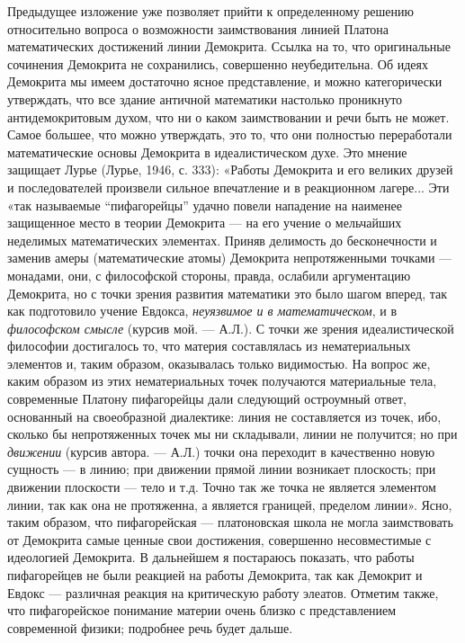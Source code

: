 Предыдущее изложение уже позволяет прийти к определенному решению
относительно вопроса о возможности заимствования линией Платона
математических достижений линии Демокрита. Ссылка на то, что
оригинальные сочинения Демокрита не сохранились, совершенно
неубедительна. Об идеях Демокрита мы имеем достаточно ясное
представление, и можно категорически утверждать, что все здание
античной математики настолько проникнуто антидемокритовым духом, что
ни о каком заимствовании и речи быть не может. Самое большее, что
можно утверждать, это то, что они полностью переработали
математические основы Демокрита в идеалистическом духе. Это мнение
защищает Лурье (Лурье, 1946, с. 333): «Работы Демокрита и его великих
друзей и последователей произвели сильное впечатление и в реакционном
лагере... Эти «так называемые ``пифагорейцы'' удачно повели нападение
на наименее защищенное место в теории Демокрита --- на его учение о
мельчайших неделимых математических элементах. Приняв делимость до
бесконечности и заменив амеры (математические атомы) Демокрита
непротяженными точками --- монадами, они, с философской стороны,
правда, ослабили аргументацию Демокрита, но с точки зрения развития
математики это было шагом вперед, так как подготовило учение Евдокса,
\emph{неуязвимое и в математическом}, и в \emph{философском смысле}
(курсив мой. --- А.Л.). С точки же зрения идеалистической философии
достигалось то, что материя составлялась из нематериальных элементов
и, таким образом, оказывалась только видимостью. На вопрос же, каким
образом из этих нематериальных точек получаются материальные тела,
современные Платону пифагорейцы дали следующий остроумный ответ,
основанный на своеобразной диалектике: линия не составляется из точек,
ибо, сколько бы непротяженных точек мы ни складывали, линии не
получится; но при \emph{движении} (курсив автора. --- А.Л.) точки она
переходит в качественно новую сущность --- в линию; при движении
прямой линии возникает плоскость; при движении плоскости --- тело и
т.д. Точно так же точка не является элементом линии, так как она не
протяженна, а является границей, пределом линии». Ясно, таким образом,
что пифагорейская --- платоновская школа не могла заимствовать от
Демокрита самые ценные свои достижения, совершенно несовместимые с
идеологией Демокрита. В дальнейшем я постараюсь показать, что работы
пифагорейцев не были реакцией на работы Демокрита, так как Демокрит и
Евдокс --- различная реакция на критическую работу элеатов. Отметим
также, что пифагорейское понимание материи очень близко с
представлением современной физики; подробнее речь будет дальше.

